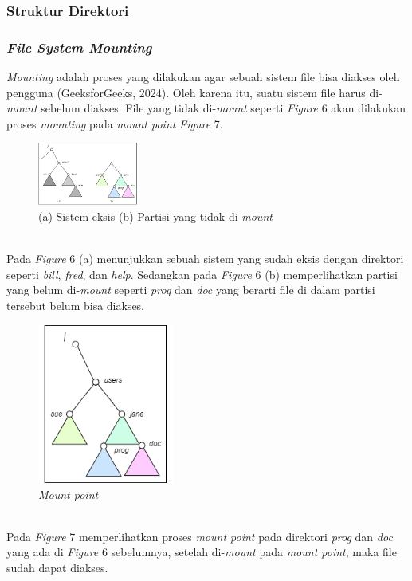 \documentclass[12pt]{article}
\begin{document}
    \subsubsection{Struktur Direktori}
    \subsubsection{\textit{File System Mounting}}
    \textit{Mounting} adalah proses yang dilakukan agar sebuah sistem file bisa diakses oleh pengguna (GeeksforGeeks, 2024). Oleh karena itu, suatu sistem file harus di-\textit{mount} sebelum diakses. File yang tidak di-\textit{mount} seperti \textit{Figure} 6 akan dilakukan proses \textit{mounting} pada \textit{mount point} \textit{Figure} 7.
        \begin{figure}[h!]
			\centering
			\includegraphics[width=0.3\textwidth]{asset/gambar6.png}
            \caption{(a) Sistem eksis (b) Partisi yang tidak di-\textit{mount}}
        \end{figure}
        \\Pada \textit{Figure} 6 (a) menunjukkan sebuah sistem yang sudah eksis dengan direktori seperti \textit{bill}, \textit{fred}, dan \textit{help}. Sedangkan pada \textit{Figure} 6 (b) memperlihatkan partisi yang belum di-\textit{mount} seperti \textit{prog} dan \textit{doc} yang berarti file di dalam partisi tersebut belum bisa diakses.
        \begin{figure}[h!]
			\centering
			\includegraphics[width=0.4\textwidth]{asset/gambar7.png}
            \caption{\textit{Mount point}}
        \end{figure}
        \\Pada \textit{Figure} 7 memperlihatkan proses \textit{mount point} pada direktori \textit{prog} dan \textit{doc} yang ada di \textit{Figure} 6 sebelumnya, setelah di-\textit{mount} pada \textit{mount point}, maka file sudah dapat diakses.
\end{document}
